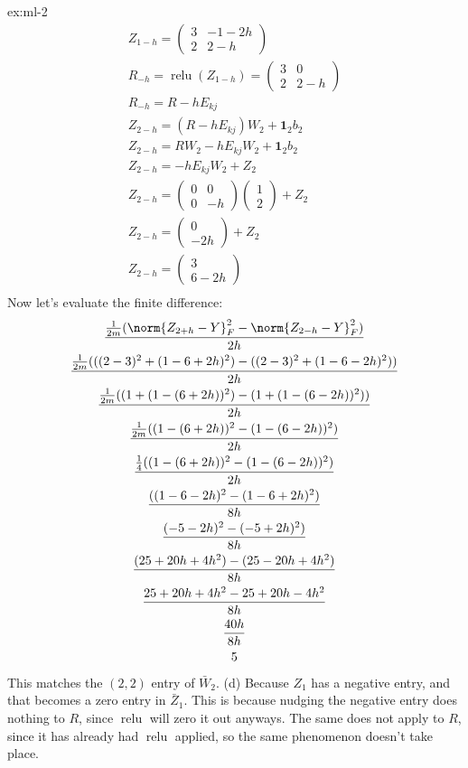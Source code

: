 \begin{solution}{ex:ml-2}
\[\begin{gathered}
      Z_{1-h}=\begin{pmatrix}3&-1-2h\\2&2-h\end{pmatrix}\\
      R_{-h}=\operatorname{relu}(Z_{1-h})=\begin{pmatrix}3&0\\2&2-h\end{pmatrix}\\
      R_{-h}=R-hE_{kj}\\
      Z_{2-h}=(R-hE_{kj})W_2+\mathbf{1}_2b_2\\
      Z_{2-h}=RW_2-hE_{kj}W_2+\mathbf{1}_2b_2\\
      Z_{2-h}=-hE_{kj}W_2+Z_2\\
      Z_{2-h}=\begin{pmatrix}0&0\\0&-h\end{pmatrix}\begin{pmatrix}1\\2\end{pmatrix}+Z_2\\
      Z_{2-h}=\begin{pmatrix}0\\-2h\end{pmatrix}+Z_2\\
      Z_{2-h}=\begin{pmatrix}3\\6-2h\end{pmatrix}\\
    \end{gathered}
  \]
  Now let's evaluate the finite difference:
  \[
    \begin{gathered}
      \frac{\frac{1}{2m}(\norm{Z_{2+h}-Y}^2_F-\norm{Z_{2-h}-Y}^2_F)}{2h}\\
      \frac{\frac{1}{2m}(((2-3)^2+(1-6+2h)^2)-((2-3)^2+(1-6-2h)^2))}{2h}\\
      \frac{\frac{1}{2m}((1+(1-(6+2h))^2)-(1+(1-(6-2h))^2))}{2h}\\
      \frac{\frac{1}{2m}((1-(6+2h))^2-(1-(6-2h))^2)}{2h}\\
      \frac{\frac{1}{4}((1-(6+2h))^2-(1-(6-2h))^2)}{2h}\\
      \frac{((1-6-2h)^2-(1-6+2h)^2)}{8h}\\
      \frac{(-5-2h)^2-(-5+2h)^2)}{8h}\\
      \frac{(25+20h+4h^2)-(25-20h+4h^2)}{8h}\\
      \frac{25+20h+4h^2-25+20h-4h^2}{8h}\\
      \frac{40h}{8h}\\
      5\\
    \end{gathered} 
  \]
  This matches the $(2,2)$ entry of $\bar W_2$.
  (d) Because $Z_1$ has a negative entry, and that becomes a zero entry in $\bar Z_1$. This is because nudging the negative entry does nothing to $R$, since $\operatorname{relu}$ will zero it out anyways. The same does not apply to $R$, since it has already had $\operatorname{relu}$ applied, so the same phenomenon doesn't take place.

\end{solution}
